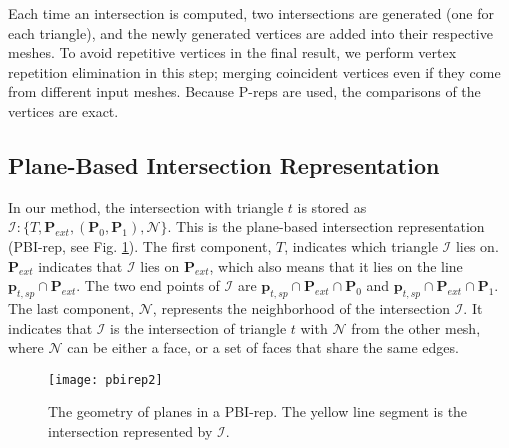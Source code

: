
Each time an intersection is computed, two intersections are generated (one for each triangle), and the newly generated vertices are added into their respective meshes. To avoid repetitive vertices in the final result, we perform vertex repetition elimination in this step; merging coincident vertices even if they come from different input meshes. Because P-reps are used, the comparisons of the vertices are exact.

\subsection{Plane-Based Intersection Representation}
\label{sec:ir}

In our method, the intersection with triangle $t$ is stored as $\bm{\mathcal{I}}\colon\{T, \bm{P}_{ext}, (\bm{P}_0, \bm{P}_1), \mathcal{N}\}$. This is the plane-based intersection representation (PBI-rep,  see Fig. \ref{fig:pbi}). The first component, $T$, indicates which triangle $\bm{\mathcal{I}}$ lies on. $\bm{P}_{ext}$ indicates that $\bm{\mathcal{I}}$ lies on $\bm{P}_{ext}$, which also means that it lies on the line $\bm{p}_{t, sp} \cap \bm{P}_{ext}$. The two end points of $\bm{\mathcal{I}}$ are $\bm{p}_{t, sp} \cap \bm{P}_{ext}\cap\bm{P}_0$ and $\bm{p}_{t, sp} \cap \bm{P}_{ext}\cap\bm{P}_1$. The last component, $\mathcal{N}$, represents the neighborhood of the intersection $\bm{\mathcal{I}}$. It indicates that $\bm{\mathcal{I}}$ is the intersection of triangle $t$ with $\mathcal{N}$ from the other mesh, where $\mathcal{N}$ can be either a face, or a set of faces that share the same edges.


\begin{figure}[t]
\centering
\texttt{[image: pbirep2]}
\caption{The geometry of planes in a PBI-rep. The yellow line segment is the intersection represented by $\bm{\mathcal{I}}$.}
\label{fig:pbi}
\end{figure}


